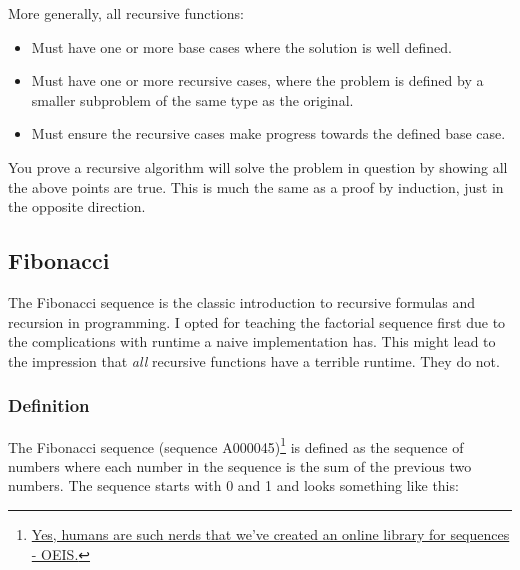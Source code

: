 More generally, all recursive functions:
\begin{itemize}
	\item Must have one or more base cases where the solution is well defined.
	\item Must have one or more recursive cases, where the problem is defined by a smaller subproblem of the same type as the original.
	\item Must ensure the recursive cases make progress towards the defined base case.
\end{itemize}


You prove a recursive algorithm will solve the problem in question by showing all the above points are true.  
This is much the same as a proof by induction, just in the opposite direction.

\subsection{Fibonacci}

The Fibonacci sequence is the classic introduction to recursive formulas and recursion in programming.  I opted for teaching the factorial sequence first due to the complications with runtime a naive implementation has.  This might lead to the impression that \textit{all} recursive functions have a terrible runtime.  They do not.  






\subsubsection{Definition}
The Fibonacci sequence  (sequence A000045)\footnote{\href{https://oeis.org/}{Yes, humans are such nerds that we've created an online library for sequences - OEIS.}} is defined as the sequence of numbers where each number in the sequence is the sum of the previous two numbers.  The sequence starts with 0 and 1  and looks something like this:

